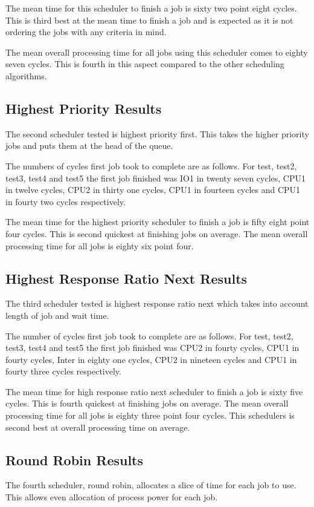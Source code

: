 \documentclass{acm_proc_article-sp}
\begin{document}
The mean time for this scheduler to finish a job is sixty two point eight cycles. This is third best at the mean time to finish a job and is expected as it is not ordering the jobs with any criteria in mind.

The mean overall processing time for all jobs using this scheduler comes to eighty seven cycles. This is fourth in this aspect compared to the other scheduling algorithms.

\subsection{Highest Priority Results}
The second scheduler tested is highest priority first. This takes the higher priority jobs and puts them at the head of the queue.

The numbers of cycles first job took to complete are as follows. For test, test2, test3, test4 and test5 the first job finished was IO1 in twenty seven cycles, CPU1 in twelve cycles, CPU2 in thirty one cycles, CPU1 in fourteen cycles and CPU1 in fourty two cycles respectively.

The mean time for the highest priority scheduler to finish a job is fifty eight point four cycles. This is second quickest at finishing jobs on average. The mean overall processing time for all jobs is eighty six point four.

\subsection{Highest Response Ratio Next Results}
The third scheduler tested is highest response ratio next which takes into account length of job and wait time.

The number of cycles first job took to complete are as follows. For test, test2, test3, test4 and test5 the first job finished was CPU2 in fourty cycles, CPU1 in fourty cycles, Inter in eighty one cycles, CPU2 in nineteen cycles and CPU1 in fourty three cycles respectively.

The mean time for high response ratio next scheduler to finish a job is sixty five cycles. This is fourth quickest at finishing jobs on average. The mean overall processing time for all jobs is eighty three point four cycles. This schedulers is second best at overall processing time on average.

\subsection{Round Robin Results}
The fourth scheduler, round robin, allocates a slice of time for each job to use. This allows even allocation of process power for each job.
\end{document}
